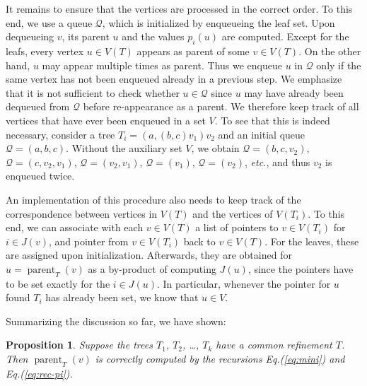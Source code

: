 \documentclass[11pt]{article}
\newtheorem{proposition}[theorem]{Proposition}
\newcommand{\parent}{\operatorname{parent}}
\begin{document}
It remains to ensure that the vertices are processed in the correct order.
To this end, we use a queue $\mathcal{Q}$, which is initialized by
enqueueing the leaf set. Upon dequeueing $v$, its parent $u$ and the values
$p_i(u)$ are computed. Except for the leafs, every vertex $u\in V(T)$
appears as parent of some $v\in V(T)$. On the other hand, $u$ may appear
multiple times as parent. Thus we enqueue $u$ in $\mathcal{Q}$ only if the
same vertex has not been enqueued already in a previous step. We emphasize
that it is not sufficient to check whether $u\in\mathcal{Q}$ since $u$ may
have already been dequeued from $\mathcal{Q}$ before re-appearance as a
parent. We therefore keep track of all vertices that have ever been
enqueued in a set $V$. To see that this is indeed necessary, consider a
tree $T_i=(a,(b,c)v_1)v_2$ and an initial queue
$\mathcal{Q}=(a,b,c)$. Without the auxiliary set $V$, we obtain
$\mathcal{Q}=(b,c,v_2)$, $\mathcal{Q}=(c,v_2,v_1)$,
$\mathcal{Q}=(v_2,v_1)$, $\mathcal{Q}=(v_1)$, $\mathcal{Q}=(v_2)$,
\textit{etc.}, and thus $v_2$ is enqueued twice. 

An implementation of this procedure also needs to keep track of the
correspondence between vertices in $V(T)$ and the vertices of $V(T_i)$. To
this end, we can associate with each $v\in V(T)$ a list of pointers to
$v\in V(T_i)$ for $i\in J(v)$, and pointer from $v\in V(T_i)$ back to
$v\in V(T)$.  For the leaves, these are assigned upon
initialization. Afterwards, they are obtained for $u=\parent_{T}(v)$ as a
by-product of computing $J(u)$, since the pointers have to be set exactly
for the $i\in J(u)$.  In particular, whenever the pointer for $u$ found
$T_i$ has already been set, we know that $u\in V$.

Summarizing the discussion so far, we have shown:
\begin{proposition}
  Suppose the trees $T_1$, $T_2$, \dots, $T_k$ have a common refinement
  $T$. Then $\parent_{T}(v)$ is correctly computed by the recursions
  Eq.(\ref{eq:mini}) and Eq.(\ref{eq:rec-pi}).
\end{proposition}
\end{document}

